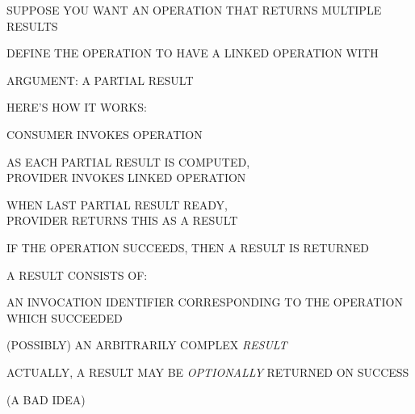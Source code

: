 \begin{bwslide}

\begin{nrtc}
\item	SUPPOSE YOU WANT AN OPERATION THAT RETURNS MULTIPLE RESULTS

\item	DEFINE THE OPERATION TO HAVE A LINKED OPERATION WITH
    \begin{nrtc}
    \item	ARGUMENT: A PARTIAL RESULT
    \end{nrtc}

\item	HERE'S HOW IT WORKS:
    \begin{nrtc}
    \item	CONSUMER INVOKES OPERATION

    \item	AS EACH PARTIAL RESULT IS COMPUTED,\\
		PROVIDER INVOKES LINKED OPERATION

    \item	WHEN LAST PARTIAL RESULT READY,\\
		PROVIDER RETURNS THIS AS A RESULT
    \end{nrtc}
\end{nrtc}
\end{bwslide}


\begin{bwslide}

\begin{nrtc}
\item	IF THE OPERATION SUCCEEDS, THEN A RESULT IS RETURNED

\item	A RESULT CONSISTS OF:
    \begin{nrtc}
    \item	AN INVOCATION IDENTIFIER CORRESPONDING TO THE OPERATION WHICH
		SUCCEEDED

    \item	(POSSIBLY) AN ARBITRARILY COMPLEX \emph{RESULT}
    \end{nrtc}

\item	ACTUALLY, A RESULT MAY BE \emph{OPTIONALLY} RETURNED ON SUCCESS
    \begin{nrtc}
    \item	(A BAD IDEA)
    \end{nrtc}
\end{nrtc}
\end{bwslide}


